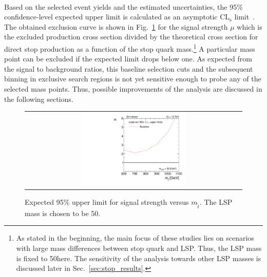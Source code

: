 \\
Based on the selected event yields and the estimated uncertainties, the 95\% confidence-level expected upper limit is calculated as an asymptotic $\mathrm{CL_s}$ limit~\cite{bib:theta}. The obtained exclusion curve is shown in Fig.~\ref{fig:stop_baseline_limit} for the signal strength $\mu$ which is the excluded production cross section divided by the theoretical cross section for direct stop production as a function of the stop quark mass.\footnote{As stated in the beginning, the main focus of these studies lies on scenarios with large mass differences between stop quark and LSP. Thus, the LSP mass is fixed to 50\gev here. The sensitivity of the analysis towards other LSP masses is discussed later in Sec.~\ref{sec:stop_results}.} A particular mass point can be excluded if the expected limit drops below one. As expected from the signal to background ratios, this baseline selection cuts and the subsequent binning in exclusive search regions is not yet sensitive enough to probe any of the selected mass points. Thus, possible improvements of the analysis are discussed in the following sections.  
\begin{figure}[!h]
  \centering
  \begin{tabular}{c}
                \includegraphics[width=0.49\textwidth]{figures/limitplot4BinSel_Baseline_LSP50.pdf} 
  \end{tabular}
  \caption{Expected 95\% upper limit for signal strength versus $m_{\tilde{t}}$. The LSP mass is chosen to be 50\gev.}
  \label{fig:stop_baseline_limit}
\end{figure}

